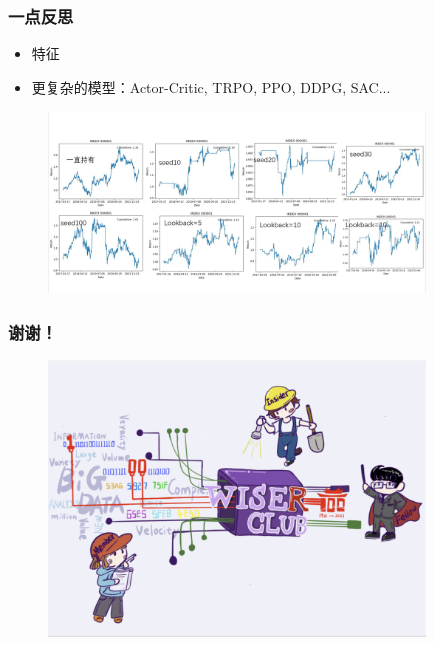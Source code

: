 \documentclass[9pt]{beamer}
\begin{document}
\begin{frame}
\frametitle{一点反思}

\begin{itemize}
\item 特征
\item 更复杂的模型：Actor-Critic, TRPO, PPO, DDPG, SAC...
\end{itemize}

\begin{figure}
\centering
\includegraphics[width=10cm]{../fig/result.jpg}
\end{figure}


\end{frame}

\begin{frame}
\frametitle{谢谢！}
\begin{figure}
\centering
\includegraphics[width=10cm]{../fig/wiserclub.png}
\end{figure}
\end{frame}
\end{document}
